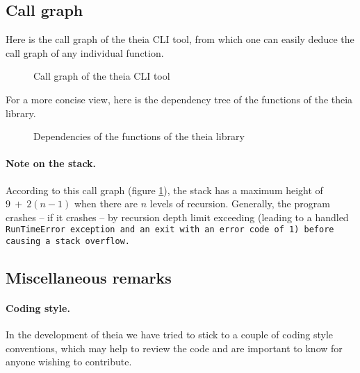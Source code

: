 \documentclass{article}
\begin{document}
\subsection{Call graph}

Here is the call graph of the theia CLI tool, from which one can easily deduce the call graph of any individual function.


\begin{figure}[h]
\begin{center}
\end{center}
\caption{Call graph of the theia CLI tool}
\label{callgraph}
\end{figure}

For a more concise view, here is the dependency tree of the functions of the theia library.

\begin{figure}[h]
\begin{center}
\end{center}
\caption{Dependencies of the functions of the theia library}
\end{figure}

\paragraph{Note on the stack.}According to this call graph (figure \ref{callgraph}), the stack has a maximum height of $9~+~2(n-1)$ when there are $n$ levels of recursion. Generally, the program crashes -- if it crashes -- by recursion depth limit exceeding (leading to a handled \tt{RunTimeError} exception and an exit with an error code of 1) before causing a stack overflow.

\subsection{Miscellaneous remarks}

\paragraph{Coding style.}In the development of theia we have tried to stick to a couple of coding style conventions, which may help to review the code and are important to know for anyone wishing to contribute.
\end{document}
